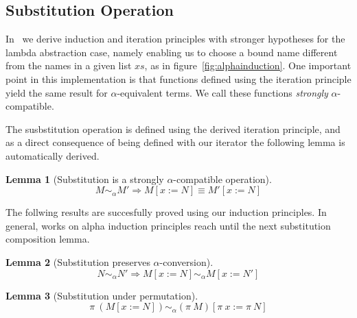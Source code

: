 \documentclass[preprint,10pt]{sigplanconf}
\newcommand{\alp}{\ensuremath{\alpha}}
\newcommand{\lam}{\ensuremath{\lambda}}
\newcommand{\alpsym}{\ensuremath{\sim_\alpha}}
\newcommand{\conc}{\ensuremath{+\!\!+}}
\newtheorem{lemma}{Lemma}
\begin{document}
\subsection{Substitution Operation} 

In~\cite{CopelloTSBF16} we derive induction and iteration principles with stronger hypotheses for the lambda abstraction case, namely  enabling us to choose a bound name  different from the names in a given list $\mathit{xs}$, as in figure~\ref{fig:alphainduction}. One  important point in this implementation is that functions defined using the iteration principle yield the same result for  $\alpha$-equivalent terms. We call these functions \emph{strongly} \alp-compatible.

The susbstitution operation is defined using  the derived  iteration principle, and as a direct consequence of  being defined with our iterator the following lemma is automatically derived.


\begin{lemma}[Substitution  is a strongly $\alpha$-compatible operation]
   \label{substlemma1}
  \[ M \alpsym M' \Rightarrow M [x{:=} N] \equiv M' [x{:=}N] \]
\end{lemma}

The follwing results are succesfully proved using our induction principles. In general, works on alpha induction principles reach until the next substitution composition lemma.

\begin{lemma}[Substitution  preserves $\alpha$-conversion]
   \label{substlemma2}
  \[ N \alpsym N' \Rightarrow M [x {:=} N] \alpsym M [x {:=} N'] \]
\end{lemma}

\begin{lemma}[Substitution under permutation]
   \label{substPerm}
  \[ \pi\ (M [x {:=} N])  \alpsym (\pi\ M) [ \pi\ x  {:=}  \pi\ N ] \]
\end{lemma}
\end{document}
